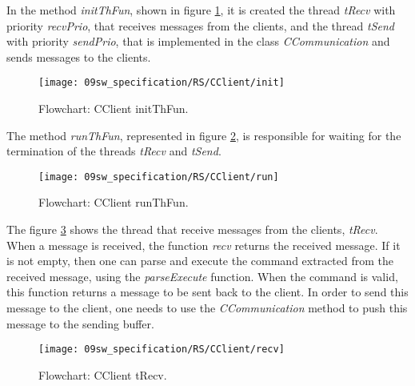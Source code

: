 In the method \textit{initThFun}, shown in figure \ref{fig:clientInit}, it is created the thread \textit{tRecv} with priority \textit{recvPrio}, that receives messages from the clients, and the thread \textit{tSend} with priority \textit{sendPrio}, that is implemented in the class \textit{CCommunication} and sends messages to the clients.

\begin{figure}[H]
	\centering
	\texttt{[image: 09sw\_specification/RS/CClient/init]}
	\caption{Flowchart: CClient initThFun.}
	\label{fig:clientInit}
\end{figure}

The method \textit{runThFun}, represented in figure \ref{fig:clientRun}, is responsible for waiting for the termination of the threads \textit{tRecv} and \textit{tSend}.

\begin{figure}[H]
	\centering
	\texttt{[image: 09sw\_specification/RS/CClient/run]}
	\caption{Flowchart: CClient runThFun.}
	\label{fig:clientRun}
\end{figure}

The figure \ref{fig:RSRecv} shows the thread that receive messages from the clients, \textit{tRecv}. When a message is received, the function \textit{recv} returns the received message. If it is not empty, then one can parse and execute the command extracted from the received message, using the \textit{parseExecute} function. When the command is valid, this function returns a message to be sent back to the client. In order to send this message to the client, one needs to use the \textit{CCommunication} method to push this message to the sending buffer.

\begin{figure}[H]
	\centering
	\texttt{[image: 09sw\_specification/RS/CClient/recv]}
	\caption{Flowchart: CClient tRecv.}
	\label{fig:RSRecv}
\end{figure}


